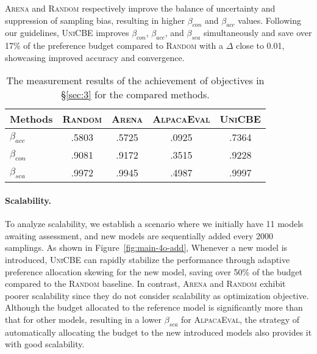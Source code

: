 \textsc{Arena} and \textsc{Random} respectively improve the balance of uncertainty and suppression of sampling bias, resulting in higher $\beta_{con}$ and $\beta_{acc}$ values.
%
Following our guidelines, \textsc{UniCBE} improves $\beta_{con}$, $\beta_{acc}$, and $\beta_{sca}$ simultaneously and save over 17\% of the preference budget compared to \textsc{Random} with a $\Delta$ close to 0.01, showcasing improved accuracy and convergence.
\begin{table}[h]
\renewcommand\arraystretch{1.4}
\centering
\setlength{\tabcolsep}{0.6em} 
\vspace{-0.4cm}
\caption{The measurement results of the achievement of objectives in \S\ref{sec:3} for the compared methods.}
\begin{tabular}{lcccc}
\toprule
Methods&\textsc{Random}&\textsc{Arena}&\textsc{AlpacaEval}&\textsc{UniCBE}\\
\midrule
$\beta_{acc}$&.5803&.5725&.0925&.7364\\
$\beta_{con}$&.9081&.9172&.3515&.9228\\
$\beta_{sca}$&.9972&.9945&.4987&.9997\\
\bottomrule
\end{tabular}
\vspace{-0.4cm}
\label{tab:beta}
\end{table}

\paragraph{Scalability.}
To analyze scalability, we establish a scenario where we initially have 11 models awaiting assessment, and new models are sequentially added every 2000 samplings.
As shown in Figure~\ref{fig:main-4o-add}, 
Whenever a new model is introduced, \textsc{UniCBE} can rapidly stabilize the performance through adaptive preference allocation skewing for the new model, saving over 50\% of the budget compared to the \textsc{Random} baseline. In contrast, \textsc{Arena} and \textsc{Random} exhibit poorer scalability since they do not consider scalability as optimization objective. Although the budget allocated to the reference model is significantly more than that for other models, resulting in a lower \(\beta_{sca}\) for \textsc{AlpacaEval}, the strategy of automatically allocating the budget to the new introduced models also provides it with good scalability.

